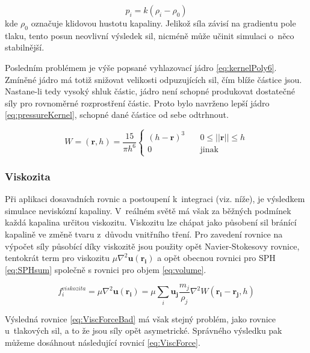 \begin{equation}
	p_i = k(\rho_i - \rho_0)
	\label{eq:idealGasRest}
\end{equation}
kde $\rho_0$ označuje klidovou hustotu kapaliny. Jelikož síla závisí na gradientu pole tlaku, tento posun neovlivní výsledek sil, nicméně může učinit simulaci o~něco stabilnější.

Posledním problémem je výše popsané vyhlazovací jádro \ref{eq:kernelPoly6}. Zmíněné jádro má totiž snižovat velikosti odpuzujících sil, čím blíže částice jsou. Nastane-li tedy vysoký shluk částic, jádro není schopné produkovat dostatečné síly pro rovnoměrné rozprostření částic. Proto bylo navrženo \cite{Desbrun96} lepší jádro \ref{eq:pressureKernel}, schopné dané částice od sebe odtrhnout.

\begin{equation}
	W = (\mathbf{r}, h) = \frac{15}{\pi h^6}
	\begin{cases}
		(h - \mathbf{r})^3 & \quad 0 \leq ||\mathbf{r}|| \leq h \\
		0                  & \quad \text{jinak}
	\end{cases}
	\label{eq:pressureKernel}
\end{equation}

\subsubsection{Viskozita}
Při aplikaci dosavadních rovnic a postoupení k~integraci (viz. níže), je výsledkem simulace neviskózní kapaliny. V~reálném světě má však za běžných podmínek každá kapalina určitou viskozitu. Viskozitu lze chápat jako působení sil bránící kapalině ve změně tvaru z~důvodu vnitřního tření. Pro zavedení rovnice na výpočet síly působící díky viskozitě jsou použity opět Navier-Stokesovy rovnice, tentokrát term pro viskozitu $\mu \nabla^2\mathbf{u}(\mathbf{r_i})$ a opět obecnou rovnici pro SPH \ref{eq:SPHsum} společně s rovnici pro objem \ref{eq:volume}.

\begin{equation}
	f^{viskozita}_i = \mu \nabla^2\mathbf{u}(\mathbf{r_i}) = \mu \sum_i \mathbf{u_j} \frac{m_j}{\rho_j} \nabla^2 W(\mathbf{r_i} - \mathbf{r_j},h)
	\label{eq:ViscForceBad}
\end{equation}

Výsledná rovnice \ref{eq:ViscForceBad} má však stejný problém, jako rovnice u~tlakových sil, a to že jsou síly opět asymetrické. Správného výsledku pak můžeme dosáhnout následující rovnicí \ref{eq:ViscForce}. \cite{Muller03}

